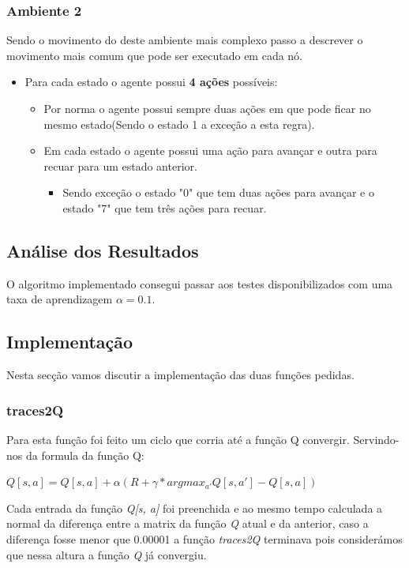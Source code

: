 \documentclass[9pt, a4paper, twocolumn]{article}
\begin{document}
\subsubsection{Ambiente 2}
Sendo o movimento do deste ambiente mais complexo passo a descrever o movimento mais comum que pode ser executado em cada nó.
\begin{itemize}
\item Para cada estado o agente possui \textbf{4 ações} possíveis:
\begin{itemize}
\item Por norma o agente possui sempre duas ações em que pode ficar no mesmo estado(Sendo o estado 1 a exceção a esta regra).
\item Em cada estado o agente possui uma ação para avançar e outra para recuar para um estado anterior.
\begin{itemize}
\item Sendo exceção o estado "0" que tem duas ações para avançar e o estado "7" que tem três ações para recuar.
\end{itemize}
\end{itemize}
\end{itemize}
\subsection{Análise dos Resultados}
\hspace{10mm} O algoritmo implementado consegui passar aos testes disponibilizados com uma taxa de aprendizagem $\alpha = 0.1$.
\subsection{Implementação}
\hspace{10mm}Nesta secção vamos discutir a implementação das duas funções pedidas.
\subsubsection{traces2Q}
\hspace{10mm} Para esta função foi feito um ciclo que corria até a função Q convergir. Servindo-nos da formula da função Q:
\begin{center}
$Q[s, a] = Q[s, a] + \alpha (R + \gamma * argmax_{a'}Q[s, a'] - Q[s, a])$
\end{center}
Cada entrada da função \emph{Q[s, a]} foi preenchida e ao mesmo tempo calculada a normal da diferença entre a matrix da função \emph{Q} atual e da anterior, caso a diferença fosse menor que 0.00001 a função \emph{traces2Q} terminava pois considerámos que nessa altura a função \emph{Q} já convergiu.
\end{document}
